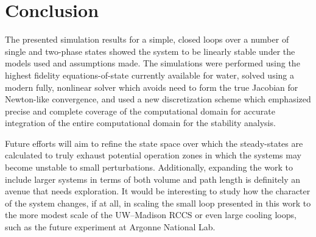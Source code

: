 \documentclass{UWMadThesis}
\begin{document}
\show\TheUniversity

\MakeTitlePage{}

\begin{LicensePage}
    \CreativeCommons
    \Attribution
    \NonCommercial
    \ShareAlike
\end{LicensePage}

\TableOfContents
\ListOfTables
\ListOfFigures

\begin{Acronym}
\end{Acronym}





\chapter{Conclusion}
The presented simulation results for a simple, closed loops over a number of single and two-phase states showed the system to be linearly stable under the models used and assumptions made.
The simulations were performed using the highest fidelity equations-of-state currently available for water, solved using a modern fully, nonlinear solver which avoids need to form the true Jacobian for Newton-like convergence, and used a new  discretization scheme which emphasized precise and complete coverage of the computational domain for accurate integration of the entire computational domain for the stability analysis.

Future efforts will aim to refine the state space over which the steady-states are calculated to truly exhaust potential operation zones in which the systems may become unstable to small perturbations.
Additionally, expanding the work to include larger systems in terms of both volume and path length is definitely an avenue that needs exploration.
It would be interesting to study how the character of the system changes, if at all, in scaling the small loop presented in this work to the more modest scale of the UW--Madison RCCS or even large cooling loops, such as the future experiment at Argonne National Lab.
\end{document}
